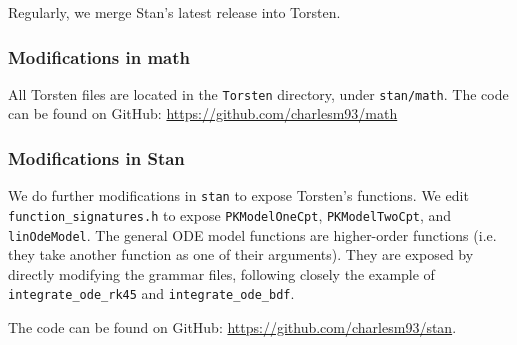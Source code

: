 \documentclass[11pt]{amsart}
\begin{document}
Regularly, we merge Stan's latest release into Torsten.

\subsubsection*{Modifications in math}
All Torsten files are located in the \texttt{Torsten} directory, under \texttt{stan/math}. The code can be found on GitHub: \url{https://github.com/charlesm93/math} 

\subsubsection*{Modifications in Stan}
We do further modifications in \texttt{stan} to expose Torsten's functions. We edit \texttt{function\_signatures.h} to expose \texttt{PKModelOneCpt}, \texttt{PKModelTwoCpt}, and \texttt{linOdeModel}. The general ODE model functions are higher-order functions (i.e. they take another function as one of their arguments). They are exposed by directly modifying the grammar files, following closely the example of \texttt{integrate\_ode\_rk45} and \texttt{integrate\_ode\_bdf}.

The code can be found on GitHub:  \url{https://github.com/charlesm93/stan}.









\end{document}
